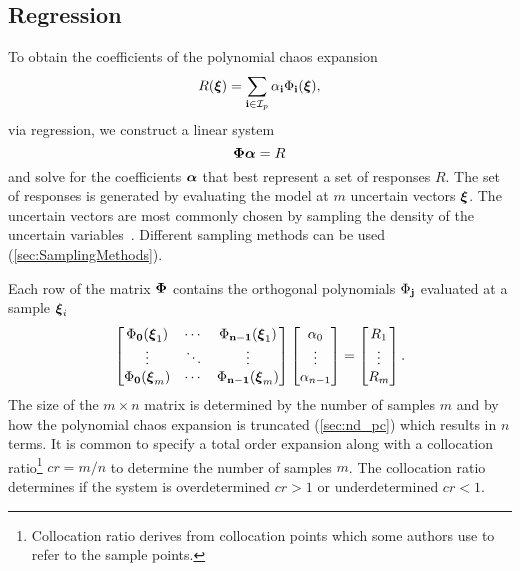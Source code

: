 \subsection{Regression}
\label{sec:PCcoeffReg}
To obtain the coefficients of the polynomial chaos expansion
\begin{equation}
  R(\boldsymbol{\xi}) = \sum_{\mathbf{i}\in \mathcal{I}_p}  \alpha_{\mathbf{i}} \Phi_{\mathbf{i}}(\boldsymbol{\xi}),
\end{equation}
via regression, we construct a linear system
\begin{equation}
  \boldsymbol{\Phi} \boldsymbol{\alpha} = R
  \label{eq:linearsystem}
\end{equation}
and solve for the coefficients $\boldsymbol{\alpha}$ that best represent a set of responses $R$. The set of responses is generated by evaluating the model at $m$ uncertain vectors $\boldsymbol{\xi}$. The uncertain vectors are most commonly chosen by sampling the density of the uncertain variables~\cite{Hosder2007}. Different sampling methods can be used (\cref{sec:SamplingMethods}).

Each row of the matrix $\boldsymbol{\Phi}$ contains the orthogonal polynomials $\Phi_{\mathbf{j}}$ evaluated at a sample $\boldsymbol{\xi}_i$
\begin{equation}
  \begin{bmatrix}
    \Phi_\mathbf{0}(\boldsymbol{\xi}_1) & \cdots & \Phi_\mathbf{n-1}(\boldsymbol{\xi}_1) \\
    \vdots & \ddots & \vdots \\
    \Phi_\mathbf{0}(\boldsymbol{\xi}_m)  &\cdots & \Phi_\mathbf{n-1}(\boldsymbol{\xi}_m)
  \end{bmatrix}
  \begin{bmatrix}
    \alpha_0 \\
    \vdots \\
    \alpha_{n-1}
    \end{bmatrix}
    =
  \begin{bmatrix}
    R_1 \\
    \vdots \\
    R_m
  \end{bmatrix}.
  \label{eq:linearsystemExpanded}
\end{equation}
The size of the $m \times n$ matrix is determined by the number of samples $m$ and by how the polynomial chaos expansion is truncated (\cref{sec:nd_pc}) which results in $n$ terms. It is common to specify a total order expansion along with a collocation ratio\footnote{Collocation ratio derives from collocation points which some authors use to refer to the sample points.} $cr = m/n$ to determine the number of samples $m$. The collocation ratio determines if the system is overdetermined $cr > 1$ or underdetermined $cr < 1$.

